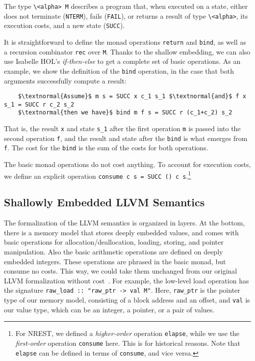 \documentclass[acmsmall]{acmart}
\newcommand{\is}{\lstinline[language=isabelle]}
\begin{document}

The type \is{\<alpha> M} describes a program that, when executed on a state, either does 
not terminate (\is{NTERM}), fails (\is{FAIL}), or returns a result of type \is{\<alpha>}, its execution costs, and a new state (\is{SUCC}).

It is straightforward to define the monad operations \is{return} and \is{bind}, as well as a recursion combinator \is{rec} over \is{M}. Thanks to the shallow embedding, we can also use Isabelle HOL's \emph{if-then-else} to get a complete 
set of basic operations. As an example, we show the definition of the \is{bind} operation, in the case that both arguments
successfully compute a result:
\begin{lstlisting}
    $\textnormal{Assume}$ m s = SUCC x c_1 s_1 $\textnormal{and}$ f x s_1 = SUCC r c_2 s_2
    $\textnormal{then we have}$ bind m f s = SUCC r (c_1+c_2) s_2
\end{lstlisting}
That is, the result \is{x} and state \is{s_1} after the first operation \is{m} is passed into the second operation \is{f}, and the result and state after the \is{bind} is what emerges from \is$f$. The cost for the \is{bind} is the sum of the costs for both operations.

The basic monad operations do not cost anything. 
To account for execution costs, we define an explicit operation \is{consume c s = SUCC () c s}.\footnote{For NREST, we defined a \emph{higher-order} operation \is{elapse}, while we use the \emph{first-order} operation \is{consume} here. This is for historical reasons. Note that \is{elapse} can be defined in terms of \is{consume}, and vice versa.}

\subsection{Shallowly Embedded LLVM Semantics}\label{llvm:shallow}

The formalization of the LLVM semantics is organized in layers. 
At the bottom, there is a memory model that stores deeply embedded values,
and comes with basic operations for allocation/deallocation, loading, storing, and pointer manipulation. Also the basic arithmetic operations are defined on deeply embedded integers.
These operations are phrased in the basic monad, but consume no costs.
This way, we could take them unchanged from our original LLVM formalization without cost~\cite{lammich2019LLVM}. For example, the low-level load operation has the signature 
\is{raw_load :: "raw_ptr -> val M"}.
Here, \is{raw_ptr} is the pointer type of our memory model, consisting of a block address and an offset, 
and \is{val} is our value type, which can be an integer, a pointer, or a pair of values.
\end{document}
